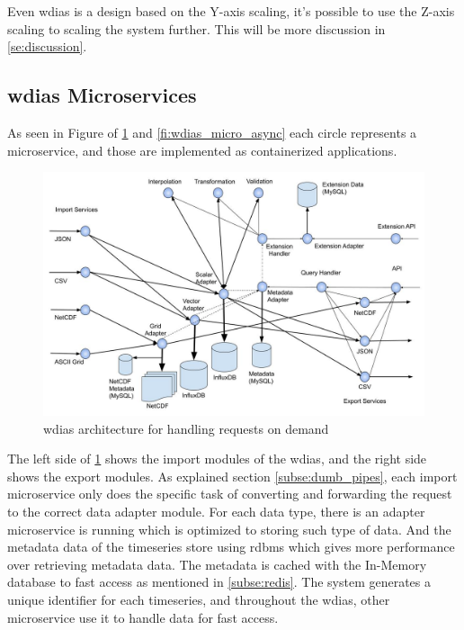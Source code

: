 Even \acrshort{wdias} is a design based on the Y-axis scaling, it's possible to use the Z-axis scaling to scaling the system further. This will be more discussion in \cref{se:discussion}.




\subsection{\acrshort{wdias} Microservices}
\label{sebse:wdias_microservices}
As seen in Figure of \cref{fi:wdias_micro_on_demand} and \cref{fi:wdias_micro_async} each circle represents a microservice, and those are implemented as containerized applications.
\begin{figure}[htp]
    \centering
    \includegraphics[width=1\textwidth]{method/microservice/microservice_architecture-handle_on_demand-v3.jpg}
    \caption{\acrshort{wdias} architecture for handling requests on demand}
    \label{fi:wdias_micro_on_demand}
\end{figure}
The left side of \cref{fi:wdias_micro_on_demand} shows the import modules of the \acrshort{wdias}, and the right side shows the export modules. As explained section \cref{subse:dumb_pipes}, each import microservice only does the specific task of converting and forwarding the request to the correct data adapter module.
For each data type, there is an adapter microservice is running which is optimized to storing such type of data. And the metadata data of the timeseries store using \acrshort{rdbms} which gives more performance over retrieving metadata data. The metadata is cached with the In-Memory database to fast access as mentioned in \cref{subse:redis}.
The system generates a unique identifier for each timeseries, and throughout the \acrshort{wdias}, other microservice use it to handle data for fast access.

